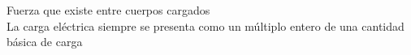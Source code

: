 \documentclass[preview]{standalone}
\begin{document}
Fuerza que existe entre cuerpos cargados\\La carga eléctrica siempre se presenta como un múltiplo
entero de una cantidad básica de carga\\
\end{document}
